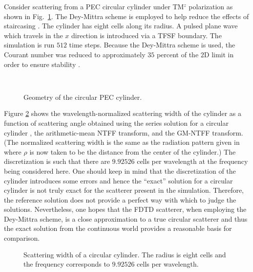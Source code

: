 Consider scattering from a PEC circular cylinder under TM$^z$
polarization as shown in Fig.\ \ref{fig:cylinderGeom}.  The Dey-Mittra
scheme is employed to help reduce the effects of staircasing
\cite{dey1997a1}.  The cylinder has eight cells along its radius.  A
pulsed plane wave which travels in the $x$ direction is introduced via
a TFSF boundary.  The simulation is
run $512$ time steps.  Because the Dey-Mittra scheme is used, the
Courant number was reduced to approximately $35$ percent of the $2$D
limit in order to ensure stability \cite{benkler2006s}.
\begin{figure}
\centering
{}\\
\caption{Geometry of the circular PEC cylinder.}
\label{fig:cylinderGeom}
\end{figure}

Figure \ref{fig:cylWidth} shows the wavelength-normalized scattering
width of the cylinder as a function of scattering angle obtained using
the series solution for a circular cylinder \cite{balanis1989b}, the
arithmetic-mean NTFF transform, and the GM-NTFF transform.  (The
normalized scattering width is the same as the radiation pattern given
in  where $\rho$ is now taken to be the distance
from the center of the cylinder.)  The discretization is such that
there are $9.92526$ cells per wavelength at the frequency being
considered here.  One should keep in mind that the discretization of
the cylinder introduces some errors and hence the ``exact'' solution
for a circular cylinder is not truly exact for the scatterer present
in the simulation.  Therefore, the reference solution does not provide
a perfect way with which to judge the solutions.  Nevertheless, one
hopes that the FDTD scatterer, when employing the Dey-Mittra scheme,
is a close approximation to a true circular scatterer and thus the
exact solution from the continuous world provides a reasonable basis
for comparison.
\begin{figure}
\begin{center}
\end{center}
\caption{Scattering width of a circular cylinder.  The radius is eight
cells and the frequency corresponds to $9.92526$ cells per wavelength.}
\label{fig:cylWidth}
\end{figure}

